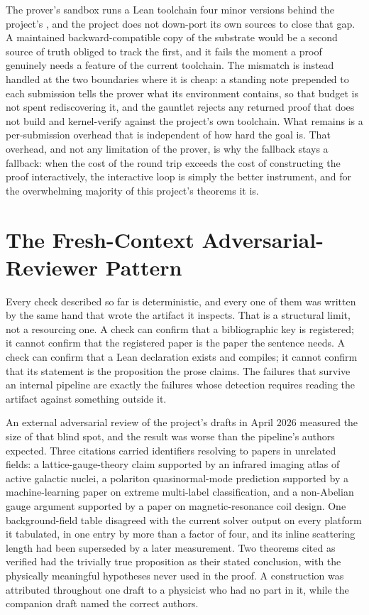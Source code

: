 \documentclass[11pt]{article}
\begin{document}
The prover's sandbox runs a Lean toolchain four minor versions behind
the project's \texttt{\leantoolchain}, and the project does not
down-port its own sources to close that gap. A maintained
backward-compatible copy of the substrate would be a second source of
truth obliged to track the first, and it fails the moment a proof
genuinely needs a feature of the current toolchain. The mismatch is
instead handled at the two boundaries where it is cheap: a standing
note prepended to each submission tells the prover what its
environment contains, so that budget is not spent rediscovering it,
and the gauntlet rejects any returned proof that does not build and
kernel-verify against the project's own toolchain. What remains is a
per-submission overhead that is independent of how hard the goal is.
That overhead, and not any limitation of the prover, is why the
fallback stays a fallback: when the cost of the round trip exceeds the
cost of constructing the proof interactively, the interactive loop is
simply the better instrument, and for the overwhelming majority of
this project's theorems it is.

\section{The Fresh-Context Adversarial-Reviewer Pattern}
\label{sec:adversarial}

Every check described so far is deterministic, and every one of them
was written by the same hand that wrote the artifact it inspects.
That is a structural limit, not a resourcing one. A check can confirm
that a bibliographic key is registered; it cannot confirm that the
registered paper is the paper the sentence needs. A check can confirm
that a Lean declaration exists and compiles; it cannot confirm that
its statement is the proposition the prose claims. The failures that
survive an internal pipeline are exactly the failures whose detection
requires reading the artifact against something outside it.

An external adversarial review of the project's drafts in April 2026
measured the size of that blind spot, and the result was worse than
the pipeline's authors expected. Three citations carried identifiers
resolving to papers in unrelated fields: a lattice-gauge-theory claim
supported by an infrared imaging atlas of active galactic nuclei, a
polariton quasinormal-mode prediction supported by a machine-learning
paper on extreme multi-label classification, and a non-Abelian gauge
argument supported by a paper on magnetic-resonance coil design. One
background-field table disagreed with the current solver output on
every platform it tabulated, in one entry by more than a factor of
four, and its inline scattering length had been superseded by a later
measurement. Two theorems cited as verified had the trivially true
proposition as their stated conclusion, with the physically
meaningful hypotheses never used in the proof. A construction was
attributed throughout one draft to a physicist who had no part in it,
while the companion draft named the correct authors.
\end{document}
